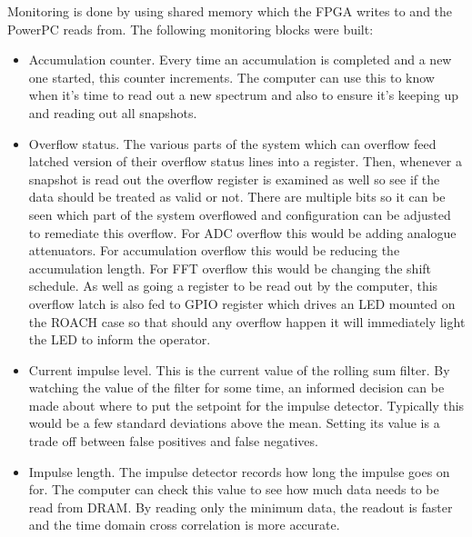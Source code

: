 Monitoring is done by using shared memory which the FPGA writes to and the PowerPC reads from. The following monitoring blocks were built:
\begin{itemize}
  \item Accumulation counter. Every time an accumulation is completed and a new one started, this counter increments. The computer can use this to know when it's time to read out a new spectrum and also to ensure it's keeping up and reading out all snapshots.
  \item Overflow status. The various parts of the system which can overflow feed latched version of their overflow status lines into a register. Then, whenever a snapshot is read out the overflow register is examined as well so see if the data should be treated as valid or not. There are multiple bits so it can be seen which part of the system overflowed and configuration can be adjusted to remediate this overflow. For ADC overflow this would be adding analogue attenuators. For accumulation overflow this would be reducing the accumulation length. For FFT overflow this would be changing the shift schedule. As well as going a register to be read out by the computer, this overflow latch is also fed to GPIO register which drives an LED mounted on the ROACH case so that should any overflow happen it will immediately light the LED to inform the operator.
  \item Current impulse level. This is the current value of the rolling sum filter. By watching the value of the filter for some time, an informed decision can be made about where to put the setpoint for the impulse detector. Typically this would be a few standard deviations above the mean. Setting its value is a trade off between false positives and false negatives.
  \item Impulse length. The impulse detector records how long the impulse goes on for. The computer can check this value to see how much data needs to be read from DRAM. By reading only the minimum data, the readout is faster and the time domain cross correlation is more accurate.
\end{itemize}

